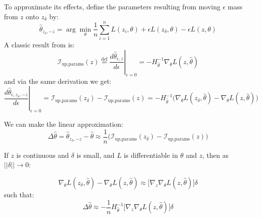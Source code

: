 \documentclass{article}
\theoremstyle{plain}
\theoremstyle{definition}
\theoremstyle{remark}
\begin{document}
To approximate its effects, define the parameters resulting from moving $\epsilon$ mass from $z$ onto $z_\delta$ by:
\begin{equation}
\hat{\theta}_{z_\delta,-z} = \arg \min_{\theta} \frac{1}{n} \sum^n_{i = 1} L(z_i, \theta) + \epsilon L(z_\delta, \theta) - \epsilon L (z,\theta)
\label{eq:pert1}
\end{equation}
A classic result from \citet{cook1982residuals} is:
\begin{equation}
\mathcal{I}_{\text{up,params}}(z) \overset{\text{def}}{=} \left. \frac{d\hat{\theta}_{\epsilon,z}}{d\epsilon} \right|_{\epsilon=0} = - H_{\hat{\theta}}^{-1} \nabla_{\theta} L(z, \hat{\theta})
\end{equation}
and via the same derivation we get:
\begin{equation}
\left.\frac{d\hat{\theta}_{\epsilon,z_\delta, -z}}{d\epsilon} \right|_{\epsilon=0} =\mathcal{I}_{\text{up,params}}(z_\delta) - \mathcal{I}_{\text{up,params}}(z) =  - H_{\hat{\theta}}^{-1} \big(\nabla_{\theta} L(z_\delta, \hat{\theta})-\nabla_{\theta} L(z, \hat{\theta})\big)
\end{equation}

We can make the linear approximation:
\begin{equation}
    \Delta\hat\theta = \hat\theta_{z_\delta,-z} - \hat\theta \approx \frac{1}{n} \big(\mathcal{I}_{\text{up,params}}(z_\delta) - \mathcal{I}_{\text{up,params}}(z) \big)
\end{equation}


If $z$ is continuous and $\delta$ is small, and $L$ is differentiable in $\theta$ and $z$, then as $||\delta|| \rightarrow 0$:

\begin{equation}
\nabla_{\theta} L(z_\delta, \hat{\theta})-\nabla_{\theta} L(z, \hat{\theta}) \approx \big[ \nabla_z \nabla_\theta L(z, \hat\theta)\big]\delta
\end{equation}
such that:
\begin{equation}
\Delta\hat\theta \approx -\frac{1}{n} H_{\hat{\theta}}^{-1} \big[ \nabla_z \nabla_\theta L(z, \hat\theta)\big]\delta
\end{equation}





\end{document}
